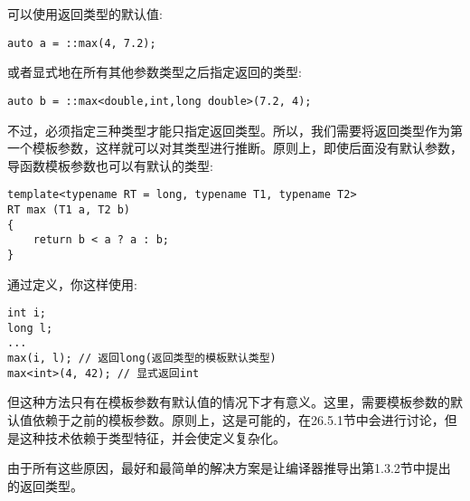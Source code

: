 可以使用返回类型的默认值:

\begin{lstlisting}[style=styleCXX]
auto a = ::max(4, 7.2);
\end{lstlisting}

或者显式地在所有其他参数类型之后指定返回的类型:

\begin{lstlisting}[style=styleCXX]
auto b = ::max<double,int,long double>(7.2, 4);
\end{lstlisting}

不过，必须指定三种类型才能只指定返回类型。所以，我们需要将返回类型作为第一个模板参数，这样就可以对其类型进行推断。原则上，即使后面没有默认参数，导函数模板参数也可以有默认的类型:

\begin{lstlisting}[style=styleCXX]
template<typename RT = long, typename T1, typename T2>
RT max (T1 a, T2 b)
{
	return b < a ? a : b;
}
\end{lstlisting}

通过定义，你这样使用:

\begin{lstlisting}[style=styleCXX]
int i;
long l;
...
max(i, l); // 返回long(返回类型的模板默认类型)
max<int>(4, 42); // 显式返回int
\end{lstlisting}

但这种方法只有在模板参数有默认值的情况下才有意义。这里，需要模板参数的默认值依赖于之前的模板参数。原则上，这是可能的，在26.5.1节中会进行讨论，但是这种技术依赖于类型特征，并会使定义复杂化。

由于所有这些原因，最好和最简单的解决方案是让编译器推导出第1.3.2节中提出的返回类型。
